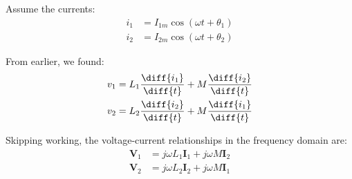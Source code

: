 \begin{multicols}{2}
\begin{CheatsheetEntryFrame}
        Assume the currents:
        \begin{align*}
            i_1 &= I_{1m} \cos{(\omega t + \theta_1)}
                \\
            i_2 &= I_{2m} \cos{(\omega t + \theta_2)}
        \end{align*}

        From earlier, we found:
        \begin{align*}
            v_1 &= L_1 \frac{\diff{i_1}}{\diff{t}} + M \frac{\diff{i_2}}{\diff{t}} \\
            v_2 &= L_2 \frac{\diff{i_2}}{\diff{t}} + M \frac{\diff{i_1}}{\diff{t}}
        \end{align*}

        Skipping working, the voltage-current relationships in the frequency domain are:
        \begin{align*}
            \mathbf{V}_1 &= j \omega L_1 \mathbf{I}_1 + j \omega M \mathbf{I}_2 \\
            \mathbf{V}_2 &= j \omega L_2 \mathbf{I}_2 + j \omega M \mathbf{I}_1
        \end{align*}

    \end{CheatsheetEntryFrame}

\end{multicols}
\newpage

